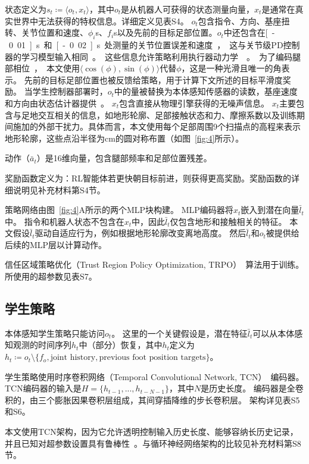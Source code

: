 \documentclass[9pt,twocolumn,twoside]{osajnl}
\begin{document}
状态定义为$s_t \coloneqq \langle o_t, x_t \rangle$，其中$o_t$是从机器人可获得的状态测量向量，$x_t$是通常在真实世界中无法获得的特权信息。详细定义见表S4。
$o_t$包含指令、方向、基座扭转、关节位置和速度、$\phi_i$s、$f_i$s以及先前的目标足部位置。$o_t$中还包含在\unit[-0.01]{s}和\unit[-0.02]{s}处测量的关节位置误差和速度，这与关节级PD控制器的学习模型输入相同。
这些信息允许策略利用执行器动力学~\cite{hwangbo2019learning}。
为了编码腿部相位，本文使用$\langle \cos(\phi), \sin(\phi) \rangle$代替$\phi$，这是一种光滑且唯一的角表示。
先前的目标足部位置也被反馈给策略，用于计算下文所述的目标平滑度奖励。
当学生控制器部署时，$o_t$中的量被替换为本体感知传感器的读数，基座速度和方向由状态估计器提供~\cite{bloesch2013state}。
$x_t$包含直接从物理引擎获得的无噪声信息。
$x_t$主要包含与足地交互相关的信息，如地形轮廓、足部接触状态和力、摩擦系数以及训练期间施加的外部干扰力。具体而言，本文使用每个足部周围9个扫描点的高程来表示地形轮廓，这些点沿半径为\unit[10]{cm}的圆对称布置（如图~\ref{fig:4}所示）。

动作（$\bar{a}_t$）是16维向量，包含腿部频率和足部位置残差。

奖励函数定义为：RL智能体若更快朝目标前进，则获得更高奖励。奖励函数的详细说明见补充材料第S4节。

策略网络由图~\ref{fig:4}A所示的两个MLP块构建。
MLP编码器将$x_t$嵌入到潜在向量$\bar{l}_t$中。
指令和机器人状态不包含在$x_t$中，因此$\bar{l}_t$仅包含地形和接触相关的特征。
本文假设$\bar{l}_t$驱动自适应行为，例如根据地形轮廓改变离地高度。
然后$\bar{l}_t$和$o_t$被提供给后续的MLP层以计算动作。

信任区域策略优化（Trust Region Policy Optimization, TRPO）~\cite{schulman2015trust}算法用于训练。
所使用的超参数见表S7。

\subsection*{学生策略}

本体感知学生策略只能访问$o_t$。
这里的一个关键假设是，潜在特征$\bar{l}_t$可以从本体感知观测的时间序列$h_t$中（部分）恢复，其中$h_t$定义为$ h_t \coloneqq o_t \setminus \{f_o, \text{joint history}, \text{previous foot position targets} \}$。

学生策略使用时序卷积网络（Temporal Convolutional Network, TCN）~\cite{bai2018empirical}编码器。
TCN编码器的输入是$H = \{h_{t-1}, ..., h_{t-N-1}\}$，其中$N$是历史长度。
编码器是全卷积的，由三个膨胀因果卷积层组成，其间穿插降维的步长卷积层。
架构详见表S5和S6。

本文使用TCN架构，因为它允许透明控制输入历史长度、能够容纳长历史记录，并且已知对超参数设置具有鲁棒性~\cite{bai2018empirical}。与循环神经网络架构的比较见补充材料第S8节。
\end{document}
